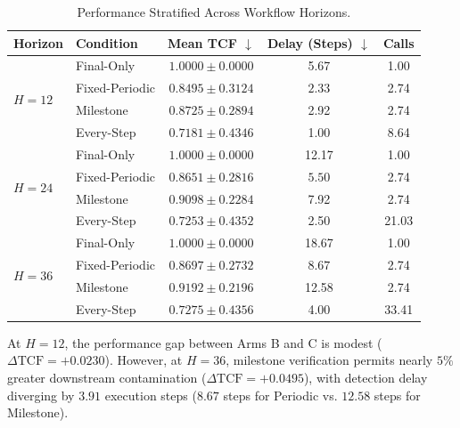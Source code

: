\begin{table}[h]
\centering
\small
\caption{Performance Stratified Across Workflow Horizons.}
\label{tab:horizon_results}
\begin{tabular}{llccc}
\toprule
\textbf{Horizon} & \textbf{Condition} & \textbf{Mean TCF} $\downarrow$ & \textbf{Delay (Steps)} $\downarrow$ & \textbf{Calls} \\
\midrule
\multirow{4}{*}{$H=12$} & Final-Only & $1.0000 \pm 0.0000$ & 5.67 & 1.00 \\
                        & Fixed-Periodic & $\mathbf{0.8495 \pm 0.3124}$ & $\mathbf{2.33}$ & 2.74 \\
                        & Milestone & $0.8725 \pm 0.2894$ & 2.92 & 2.74 \\
                        & Every-Step & $0.7181 \pm 0.4346$ & 1.00 & 8.64 \\
\midrule
\multirow{4}{*}{$H=24$} & Final-Only & $1.0000 \pm 0.0000$ & 12.17 & 1.00 \\
                        & Fixed-Periodic & $\mathbf{0.8651 \pm 0.2816}$ & $\mathbf{5.50}$ & 2.74 \\
                        & Milestone & $0.9098 \pm 0.2284$ & 7.92 & 2.74 \\
                        & Every-Step & $0.7253 \pm 0.4352$ & 2.50 & 21.03 \\
\midrule
\multirow{4}{*}{$H=36$} & Final-Only & $1.0000 \pm 0.0000$ & 18.67 & 1.00 \\
                        & Fixed-Periodic & $\mathbf{0.8697 \pm 0.2732}$ & $\mathbf{8.67}$ & 2.74 \\
                        & Milestone & $0.9192 \pm 0.2196$ & 12.58 & 2.74 \\
                        & Every-Step & $0.7275 \pm 0.4356$ & 4.00 & 33.41 \\
\bottomrule
\end{tabular}
\end{table}

At $H=12$, the performance gap between Arms B and C is modest ($\Delta \text{TCF} = +0.0230$). However, at $H=36$, milestone verification permits nearly $5\%$ greater downstream contamination ($\Delta \text{TCF} = +0.0495$), with detection delay diverging by $3.91$ execution steps ($8.67$ steps for Periodic vs. $12.58$ steps for Milestone).

